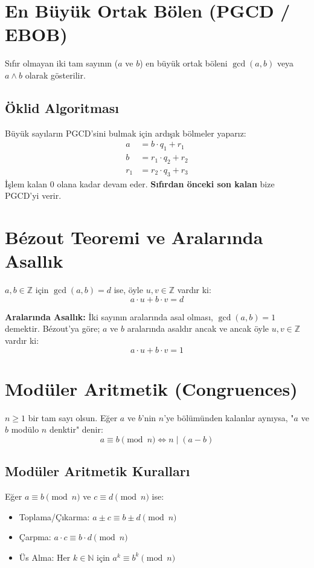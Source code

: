 \documentclass[12pt,a4paper]{report}
\begin{document}
\section{En Büyük Ortak Bölen (PGCD / EBOB)}
Sıfır olmayan iki tam sayının ($a$ ve $b$) en büyük ortak böleni $\gcd(a, b)$ veya $a \wedge b$ olarak gösterilir.

\subsection*{Öklid Algoritması}
Büyük sayıların PGCD'sini bulmak için ardışık bölmeler yaparız:
\begin{align*}
a &= b \cdot q_1 + r_1 \\
b &= r_1 \cdot q_2 + r_2 \\
r_1 &= r_2 \cdot q_3 + r_3
\end{align*}
İşlem kalan 0 olana kadar devam eder. \textbf{Sıfırdan önceki son kalan} bize PGCD'yi verir.

\section{Bézout Teoremi ve Aralarında Asallık}
\begin{tcolorbox}[colback=red!5!white,colframe=red!75!black,title=Bézout Özdeşliği]
$a, b \in \mathbb{Z}$ için $\gcd(a, b) = d$ ise, öyle $u, v \in \mathbb{Z}$ vardır ki:
\[ a \cdot u + b \cdot v = d \]
\end{tcolorbox}

\textbf{Aralarında Asallık:} İki sayının aralarında asal olması, $\gcd(a,b)=1$ demektir. Bézout'ya göre; $a$ ve $b$ aralarında asaldır ancak ve ancak öyle $u, v \in \mathbb{Z}$ vardır ki:
\[ a \cdot u + b \cdot v = 1 \]

\section{Modüler Aritmetik (Congruences)}
$n \geq 1$ bir tam sayı olsun. Eğer $a$ ve $b$'nin $n$'ye bölümünden kalanlar aynıysa, "$a$ ve $b$ modülo $n$ denktir" denir:
\[ a \equiv b \pmod n \iff n \mid (a - b) \]

\subsection*{Modüler Aritmetik Kuralları}
Eğer $a \equiv b \pmod n$ ve $c \equiv d \pmod n$ ise:
\begin{itemize}
    \item Toplama/Çıkarma: $a \pm c \equiv b \pm d \pmod n$
    \item Çarpma: $a \cdot c \equiv b \cdot d \pmod n$
    \item Üs Alma: Her $k \in \mathbb{N}$ için $a^k \equiv b^k \pmod n$
\end{itemize}
\end{document}
